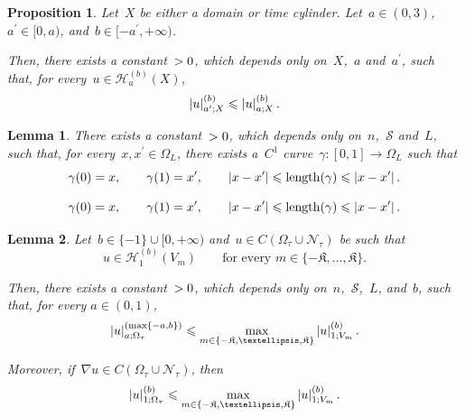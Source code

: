 \documentclass[10pt,a4paper]{amsart}
\makeatletter
\newtheorem{lemma}{Lemma}
\newtheorem{proposition}{Proposition}
\newcommand{\abs}[1]{\left\lvert#1\right\rvert}
\newcommand{\const}[1]{%
  \csname const@#1\endcsname%
}
\newcommand{\constapp}[1]{%
  \csname constapp@#1\endcsname%
}
\renewcommand{\leq}{\leqslant}
\makeatother
\begin{document}
\begin{proposition}\label{PROP::HolderEmbeddingA}
    Let~$X$ be either a domain or time cylinder. Let~$a \in (0,3)$,~$a^\prime \in [0,a)$, and~$b \in [-a^{\prime},+\infty)$. %
    
    Then, there exists a constant~$\constapp{CONST::HolderEmbeddingA}>0$, which depends only on~$X$,~$a$ and~$a^\prime$, such that, for every~$u \in \mathcal{H}_a^{(b)}(X)$,
    \begin{equation}\label{EQ::HolderEmbeddingA}
        \abs{u}_{a^\prime; X}^{(b)} \leq \constapp{CONST::HolderEmbeddingA} \abs{u}_{a; X}^{(b)}.
    \end{equation}
\end{proposition}

\begin{lemma}\label{LEM::Quasiconvexity}
    There exists a constant~$\constapp{CONST::Quasiconvexity} >0$, which depends only on~$n$,~$\mathcal{S}$ and~$L$, such that, for every~$x,x^\prime \in \Omega_L$, there exists a~$C^1$ curve~$\gamma \colon [0,1] \to \Omega_L$ such that
    \begin{equation}\label{EQ::QuasiconvexityInequality}
        \gamma(0)=x,\qquad\gamma(1)=x^\prime,\qquad\abs{x-x^\prime}\leq\operatorname{length}(\gamma)\leq \constapp{CONST::Quasiconvexity} \abs{x-x^\prime}.
    \end{equation}
\end{lemma}

    \begin{equation}
        \gamma(0)=x,\qquad\gamma(1)=x^\prime,\qquad\abs{x-x^\prime}\leq\operatorname{length}(\gamma)\leq \constapp{CONST::Quasiconvexity} \abs{x-x^\prime}.
    \end{equation}

\begin{lemma}\label{LEM::PiecewiseLipschitzToGlobalLipschitz}
    Let~$b \in \{-1\} \cup [0,+\infty)$ and~$u \in C(\Omega_\tau \cup \mathcal{N}_\tau)$ be such that%
    \begin{equation}
        u \in \mathcal{H}_1^{(b)}(V_m)\qquad \text{for every }m \in \{-\mathfrak{K},\dots,\mathfrak{K}\}.
    \end{equation}

    Then, there exists a constant~$\const{CONST::PiecewiseLipschitzToGlobalLipschitz} > 0$, which depends only on~$n$,~$\mathcal{S}$,~$L$, and~$b$, such that, for every $a \in (0,1)$,
    \begin{equation}\label{EQ::PiecewiseLipschitzToGlobalHolder}
        \abs{u}_{a; \Omega_\tau}^{(\max\{-a,b\})} \leq \const{CONST::PiecewiseLipschitzToGlobalLipschitz} \max_{m \in \{-\mathfrak{K},\dots,\mathfrak{K}\}} \abs{u}_{1; V_m}^{(b)}.
    \end{equation}

    Moreover, if~$\nabla u \in C(\Omega_\tau \cup \mathcal{N}_\tau)$, then
    \begin{equation}\label{EQ::PiecewiseLipschitzToGlobalLipschitz}
        \abs{u}_{1; \Omega_\tau}^{(b)} \leq \const{CONST::PiecewiseLipschitzToGlobalLipschitz} \max_{m \in \{-\mathfrak{K},\dots,\mathfrak{K}\}} \abs{u}_{1; V_m}^{(b)}.
    \end{equation}
\end{lemma}
\end{document}

